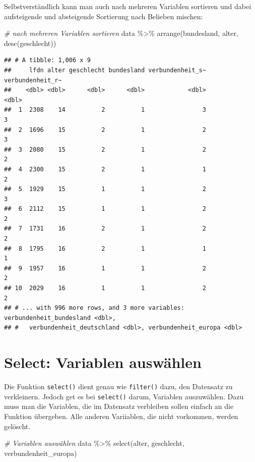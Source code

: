 \documentclass[
]{book}
\newenvironment{Shaded}{\begin{snugshade}}{\end{snugshade}}
\newcommand{\CommentTok}[1]{\textcolor[rgb]{0.56,0.35,0.01}{\textit{#1}}}
\newcommand{\FunctionTok}[1]{\textcolor[rgb]{0.00,0.00,0.00}{#1}}
\newcommand{\NormalTok}[1]{#1}
\newcommand{\SpecialCharTok}[1]{\textcolor[rgb]{0.00,0.00,0.00}{#1}}
\begin{document}
Selbstverständlich kann man auch nach mehreren Variablen sortieren und dabei aufsteigende und absteigende Sortierung nach Belieben mischen:

\begin{Shaded}
\begin{Highlighting}[]
\CommentTok{\# nach mehreren Variablen sortieren}
\NormalTok{data }\SpecialCharTok{\%\textgreater{}\%} 
  \FunctionTok{arrange}\NormalTok{(bundesland, alter, }\FunctionTok{desc}\NormalTok{(geschlecht))}
\end{Highlighting}
\end{Shaded}

\begin{verbatim}
## # A tibble: 1,006 x 9
##     lfdn alter geschlecht bundesland verbundenheit_s~ verbundenheit_r~
##    <dbl> <dbl>      <dbl>      <dbl>            <dbl>            <dbl>
##  1  2308    14          2          1                3                3
##  2  1696    15          2          1                2                3
##  3  2080    15          2          1                2                2
##  4  2300    15          2          1                1                2
##  5  1929    15          1          1                2                3
##  6  2112    15          1          1                2                2
##  7  1731    16          2          1                2                2
##  8  1795    16          2          1                1                1
##  9  1957    16          1          1                2                2
## 10  2029    16          1          1                2                2
## # ... with 996 more rows, and 3 more variables: verbundenheit_bundesland <dbl>,
## #   verbundenheit_deutschland <dbl>, verbundenheit_europa <dbl>
\end{verbatim}

\hypertarget{select-variablen-auswuxe4hlen}{%
\section{Select: Variablen auswählen}\label{select-variablen-auswuxe4hlen}}

Die Funktion \texttt{select()} dient genau wie \texttt{filter()} dazu, den Datensatz zu verkleinern. Jedoch get es bei \texttt{select()} darum, Variablen auszuwählen. Dazu muss man die Variablen, die im Datensatz verbleiben sollen einfach an die Funktion übergeben. Alle anderen Variiablen, die nicht vorkommen, werden gelöscht.

\begin{Shaded}
\begin{Highlighting}[]
\CommentTok{\# Variablen auswählen}
\NormalTok{data }\SpecialCharTok{\%\textgreater{}\%} 
  \FunctionTok{select}\NormalTok{(alter, geschlecht, verbundenheit\_europa)}
\end{Highlighting}
\end{Shaded}
\end{document}
